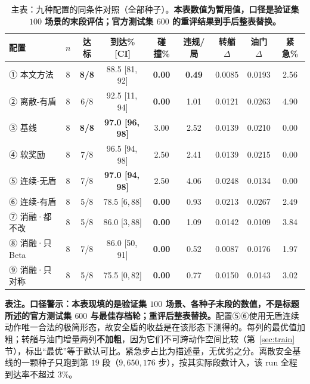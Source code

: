 \documentclass[12pt,letterpaper]{article}
\newcommand{\prov}[1]{#1}
\begin{document}
\begin{table}[htbp]
 \caption{主表：九种配置的同条件对照（全部种子）。\textbf{本表数值为暂用值，口径是验证集 $100$ 场景的末段评估；官方测试集 $600$ 的重评结果到手后整表替换。}}
 \label{tab:main}
 \centering\footnotesize
 \setlength{\tabcolsep}{4pt}
 \begin{tabular*}{\linewidth}{@{\extracolsep{\fill}}lcccccccc@{}}
  \toprule
  配置 & $n$ & 达标 & 到达\% [CI] & 碰撞\% & 违规/局 & 转艏$\Delta$ & 油门$\Delta$ & 紧急\% \\
  \midrule
  ① 本文方法        & \prov{8} & \prov{\textbf{8/8}} & \prov{88.5 [81,\,92]} & \prov{\textbf{0.00}} & \prov{\textbf{0.49}} & \prov{0.0085} & \prov{0.0193} & \prov{2.56} \\
  ② 离散-有盾       & \prov{8} & \prov{6/8} & \prov{92.5 [11,\,94]} & \prov{\textbf{0.00}} & \prov{1.01} & \prov{0.0121} & \prov{0.0263} & \prov{4.90} \\
  ③ 基线          & \prov{8} & \prov{\textbf{8/8}} & \prov{\textbf{97.0 [96,\,98]}} & \prov{3.00} & \prov{2.52} & \prov{0.0139} & \prov{0.0210} & \prov{0.00} \\
  ④ 软奖励         & \prov{8} & \prov{7/8} & \prov{96.5 [94,\,98]} & \prov{2.50} & \prov{2.41} & \prov{0.0139} & \prov{0.0215} & \prov{0.00} \\
  ⑤ 连续-无盾       & \prov{8} & \prov{7/8} & \prov{\textbf{97.0 [94,\,98]}} & \prov{2.50} & \prov{4.06} & \prov{0.0248} & \prov{0.0134} & \prov{0.00} \\
  ⑥ 连续-有盾       & \prov{8} & \prov{5/8} & \prov{78.5 [6,\,88]} & \prov{\textbf{0.00}} & \prov{0.93} & \prov{0.0213} & \prov{0.0267} & \prov{2.49} \\
  ⑦ 消融·都不改      & \prov{8} & \prov{5/8} & \prov{86.0 [3,\,88]} & \prov{\textbf{0.00}} & \prov{1.09} & \prov{0.0142} & \prov{0.0109} & \prov{3.84} \\
  ⑧ 消融·只 Beta   & \prov{8} & \prov{7/8} & \prov{86.0 [50,\,91]} & \prov{\textbf{0.00}} & \prov{0.52} & \prov{0.0087} & \prov{0.0176} & \prov{1.97} \\
  ⑨ 消融·只对称      & \prov{8} & \prov{5/8} & \prov{75.5 [0,\,82]} & \prov{\textbf{0.00}} & \prov{0.77} & \prov{0.0150} & \prov{0.0143} & \prov{3.02} \\
  \bottomrule
 \end{tabular*}

 \vspace{4pt}\footnotesize
 \textbf{表注。}\textbf{口径警示：本表现填的是验证集 $100$ 场景、各种子末段的数值，不是标题所述的官方测试集 $600$ 与最佳存档轮；重评后整表替换。}配置⑤⑥使用无盾连续动作唯一合法的极简形态，故安全盾的收益是在该形态下测得的。每列的最优值加粗；转艏与油门增量两列\textbf{不加粗}，因为它们不可跨动作空间比较（第~\ref{sec:train} 节），标出“最优”等于默认可比。紧急步占比为描述量，无优劣之分。离散安全基线的一颗种子只跑到第 $19$ 段（$9{,}650{,}176$ 步），按其实际段数计入，该 run 全程到达率不超过 $3\%$。
\end{table}
\end{document}
